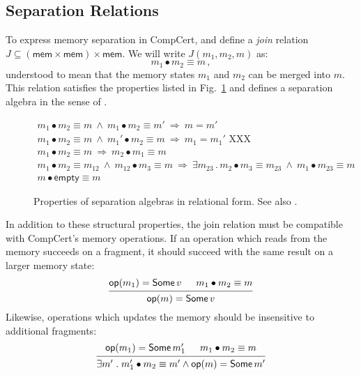 \documentclass[acmsmall,screen,review,anonymous]{acmart}
\newcommand{\kw}[1]{\ensuremath{ \mathsf{#1} }}
\begin{document}
\subsection{Separation Relations} %

To express memory separation in CompCert,
and define a \emph{join} relation
$J \subseteq (\kw{mem} \times \kw{mem}) \times \kw{mem}$.
We will write $J(m_1, m_2, m)$ as:
\[
  m_1 \bullet m_2 \equiv m
  \,,
\]
understood to mean that
the memory states $m_1$ and $m_2$
can be merged into $m$.
This relation satisfies the properties listed in Fig.~\ref{fig:sepalg}
and defines a separation algebra in the sense of \citet{freshlook}.

\begin{figure}
  \begin{gather*}
    m_1 \bullet m_2 \equiv m \:\wedge\:
      m_1 \bullet m_2 \equiv m' \:\Rightarrow\:
      m = m'
      \\
    m_1 \bullet m_2 \equiv m \:\wedge\:
      m_1' \bullet m_2 \equiv m \:\Rightarrow\:
      m_1 = m_1'
      \text{ XXX}
      \\
    m_1 \bullet m_2 \equiv m \:\Rightarrow\:
      m_2 \bullet m_1 \equiv m
      \\
    m_1 \bullet m_2 \equiv m_{12} \:\wedge\:
      m_{12} \bullet m_3 \equiv m \:\Rightarrow\:
      \exists m_{23} \mathrel.
      m_2 \bullet m_3 \equiv m_{23} \:\wedge\:
      m_1 \bullet m_{23} \equiv m
      \\
    m \bullet \kw{empty} \equiv m
  \end{gather*}
  \caption{Properties of separation algebras
    in relational form. See also \citet{freshlook}.}
  \label{fig:sepalg}
\end{figure}

In addition to these structural properties,
the join relation must be compatible
with CompCert's memory operations.
If an operation which reads from the memory succeeds on a fragment,
it should succeed with the same result on a larger memory state:
\[
  \begin{prooftree}
    \hypo{\kw{op}(m_1) = \kw{Some}\,v}
    \hypo{m_1 \bullet m_2 \equiv m}
    \infer2{\kw{op}(m) = \kw{Some}\,v}
  \end{prooftree}
\]
Likewise,
operations which updates the memory
should be insensitive to additional fragments:
\[
  \begin{prooftree}
    \hypo{\kw{op}(m_1) = \kw{Some}\,m_1'}
    \hypo{m_1 \bullet m_2 \equiv m}
    \infer2{\exists m' \mathrel.
      m_1' \bullet m_2 \equiv m' \wedge
      \kw{op}(m) = \kw{Some}\,m'}
  \end{prooftree}
\]
\end{document}
